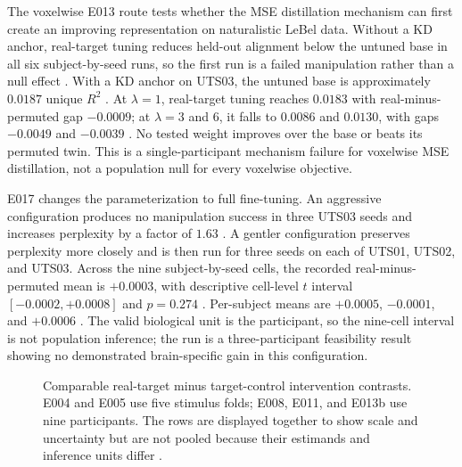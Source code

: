 The voxelwise E013 route tests whether the MSE distillation mechanism can first create an improving representation on naturalistic LeBel data.
Without a KD anchor, real-target tuning reduces held-out alignment below the untuned base in all six subject-by-seed runs, so the first run is a failed manipulation rather than a null effect .
With a KD anchor on UTS03, the untuned base is approximately $0.0187$ unique $R^2$ .
At $\lambda=1$, real-target tuning reaches $0.0183$ with real-minus-permuted gap $-0.0009$; at $\lambda=3$ and $6$, it falls to $0.0086$ and $0.0130$, with gaps $-0.0049$ and $-0.0039$ .
No tested weight improves over the base or beats its permuted twin.
This is a single-participant mechanism failure for voxelwise MSE distillation, not a population null for every voxelwise objective.

E017 changes the parameterization to full fine-tuning.
An aggressive configuration produces no manipulation success in three UTS03 seeds and increases perplexity by a factor of $1.63$ .
A gentler configuration preserves perplexity more closely and is then run for three seeds on each of UTS01, UTS02, and UTS03.
Across the nine subject-by-seed cells, the recorded real-minus-permuted mean is $+0.0003$, with descriptive cell-level $t$ interval $[-0.0002,+0.0008]$ and $p=0.274$ .
Per-subject means are $+0.0005$, $-0.0001$, and $+0.0006$ .
The valid biological unit is the participant, so the nine-cell interval is not population inference; the run is a three-participant feasibility result showing no demonstrated brain-specific gain in this configuration.

\begin{figure}[t]
  \centering
  \caption{Comparable real-target minus target-control intervention contrasts. E004 and E005 use five stimulus folds; E008, E011, and E013b use nine participants. The rows are displayed together to show scale and uncertainty but are not pooled because their estimands and inference units differ .}
  \label{fig:intervention-forest}
\end{figure}


